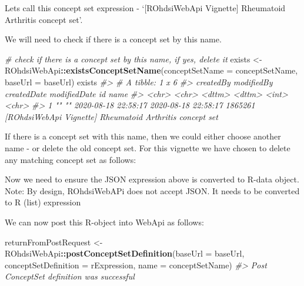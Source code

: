 \documentclass[
]{article}
\newenvironment{Shaded}{\begin{snugshade}}{\end{snugshade}}
\newcommand{\CommentTok}[1]{\textcolor[rgb]{0.56,0.35,0.01}{\textit{#1}}}
\newcommand{\ControlFlowTok}[1]{\textcolor[rgb]{0.13,0.29,0.53}{\textbf{#1}}}
\newcommand{\DataTypeTok}[1]{\textcolor[rgb]{0.13,0.29,0.53}{#1}}
\newcommand{\KeywordTok}[1]{\textcolor[rgb]{0.13,0.29,0.53}{\textbf{#1}}}
\newcommand{\NormalTok}[1]{#1}
\newcommand{\OperatorTok}[1]{\textcolor[rgb]{0.81,0.36,0.00}{\textbf{#1}}}
\newcommand{\StringTok}[1]{\textcolor[rgb]{0.31,0.60,0.02}{#1}}
\begin{document}
Lets call this concept set expression - `{[}ROhdsiWebApi Vignette{]}
Rheumatoid Arthritis concept set'.

We will need to check if there is a concept set by this name.

\begin{Shaded}
\begin{Highlighting}[]
\CommentTok{# check if there is a concept set by this name, if yes, delete it}
\NormalTok{exists <-}\StringTok{ }\NormalTok{ROhdsiWebApi}\OperatorTok{::}\KeywordTok{existsConceptSetName}\NormalTok{(}\DataTypeTok{conceptSetName =}\NormalTok{ conceptSetName, }\DataTypeTok{baseUrl =}\NormalTok{ baseUrl)}
\NormalTok{exists}
\CommentTok{#> # A tibble: 1 x 6}
\CommentTok{#>   createdBy modifiedBy createdDate         modifiedDate             id name                                                    }
\CommentTok{#>   <chr>     <chr>      <dttm>              <dttm>                <int> <chr>                                                   }
\CommentTok{#> 1 ""        ""         2020-08-18 22:58:17 2020-08-18 22:58:17 1865261 [ROhdsiWebApi Vignette] Rheumatoid Arthritis concept set}
\end{Highlighting}
\end{Shaded}

If there is a concept set with this name, then we could either choose
another name - or delete the old concept set. For this vignette we have
chosen to delete any matching concept set as follows:

\begin{Shaded}
\end{Shaded}

Now we need to ensure the JSON expression above is converted to R-data
object. Note: By design, ROhdsiWebAPi does not accept JSON. It needs to
be converted to R (list) expression

We can now post this R-object into WebApi as follows:

\begin{Shaded}
\begin{Highlighting}[]
\NormalTok{returnFromPostRequest <-}\StringTok{ }\NormalTok{ROhdsiWebApi}\OperatorTok{::}\KeywordTok{postConceptSetDefinition}\NormalTok{(}\DataTypeTok{baseUrl =}\NormalTok{ baseUrl, }
                                                                \DataTypeTok{conceptSetDefinition =}\NormalTok{ rExpression, }
                                                                \DataTypeTok{name =}\NormalTok{ conceptSetName)}
\CommentTok{#> Post ConceptSet definition was successful}
\end{Highlighting}
\end{Shaded}
\end{document}
